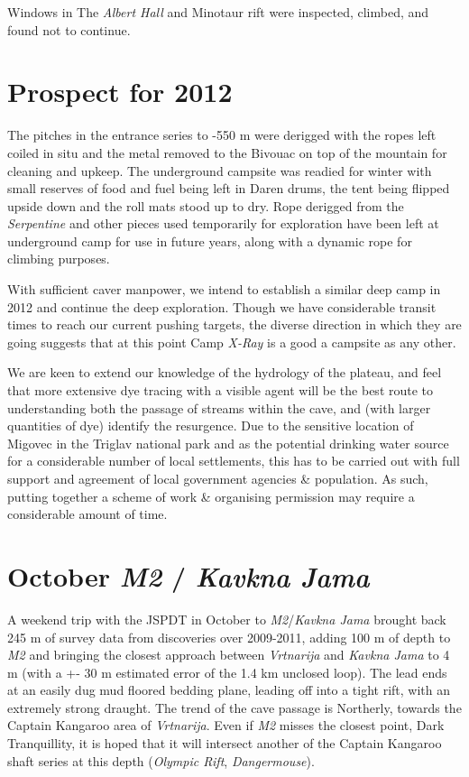 Windows in The \emph{Albert Hall} and Minotaur rift were inspected,
climbed, and found not to continue.

\hypertarget{prospect-for-2012}{%
\section{Prospect for 2012}\label{prospect-for-2012}}

The pitches in the entrance series to -550 m were derigged with the
ropes left coiled in situ and the metal removed to the Bivouac on top of
the mountain for cleaning and upkeep. The underground campsite was
readied for winter with small reserves of food and fuel being left in
Daren drums, the tent being flipped upside down and the roll mats stood
up to dry. Rope derigged from the \emph{Serpentine} and other pieces
used temporarily for exploration have been left at underground camp for
use in future years, along with a dynamic rope for climbing purposes.

With sufficient caver manpower, we intend to establish a similar deep
camp in 2012 and continue the deep exploration. Though we have
considerable transit times to reach our current pushing targets, the
diverse direction in which they are going suggests that at this point
Camp \emph{X-Ray} is a good a campsite as any other.

We are keen to extend our knowledge of the hydrology of the plateau, and
feel that more extensive dye tracing with a visible agent will be the
best route to understanding both the passage of streams within the cave,
and (with larger quantities of dye) identify the resurgence. Due to the
sensitive location of Migovec in the Triglav national park and as the
potential drinking water source for a considerable number of local
settlements, this has to be carried out with full support and agreement
of local government agencies \& population. As such, putting together a
scheme of work \& organising permission may require a considerable
amount of time.

\hypertarget{october-m2-kavkna-jama}{%
\section{\texorpdfstring{October \emph{M2} / \emph{Kavkna
Jama}}{October M2 / Kavkna Jama}}\label{october-m2-kavkna-jama}}

A weekend trip with the JSPDT in October to \emph{M2}/\emph{Kavkna Jama}
brought back 245 m of survey data from discoveries over 2009-2011,
adding 100 m of depth to \emph{M2} and bringing the closest approach
between \emph{Vrtnarija} and \emph{Kavkna Jama} to 4 m (with a +- 30 m
estimated error of the 1.4 km unclosed loop). The lead ends at an easily
dug mud floored bedding plane, leading off into a tight rift, with an
extremely strong draught. The trend of the cave passage is Northerly,
towards the Captain Kangaroo area of \emph{Vrtnarija}. Even if \emph{M2}
misses the closest point, Dark Tranquillity, it is hoped that it will
intersect another of the Captain Kangaroo shaft series at this depth
(\emph{Olympic Rift}, \emph{Dangermouse}).

